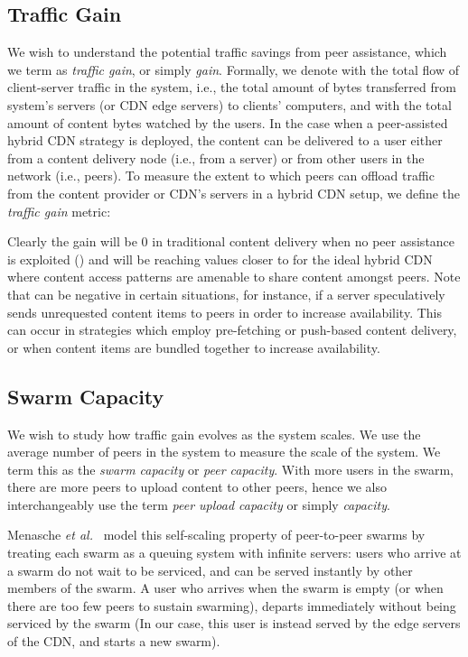 \documentclass[10pt, conference, letterpaper]{IEEEtran}
\begin{document}
\subsection{Traffic Gain}
We wish to understand the potential traffic savings from peer assistance, which we term as \emph{traffic gain}, or simply \emph{gain}. Formally, we denote with  the total flow of client-server traffic in the system, i.e., the total amount of bytes transferred from system's servers (or CDN edge servers) to clients' computers, and with  the total amount of content bytes watched by the users. In the case when a peer-assisted hybrid CDN strategy is deployed, the content can be delivered to a user either from a content delivery node (i.e., from a server) or from other users in the network (i.e., peers).  To measure the extent to which peers can offload traffic from the content provider or CDN's servers in a hybrid CDN setup, we define the \emph{traffic gain} metric: 


Clearly the gain will be 0 in traditional content delivery when no peer assistance is exploited () and will be reaching values closer to  for the ideal hybrid CDN where content access patterns are amenable to share content amongst peers. Note that  can be negative in certain situations, for instance, if a server speculatively sends unrequested content items to peers in order to increase availability. This can occur in strategies which employ pre-fetching or push-based content delivery, or when content items are bundled together to increase availability.

\subsection{Swarm Capacity}
We wish to study how traffic gain evolves as the system scales. We use the average number of peers in the system to measure the scale of the system. We term this as the \emph{swarm capacity} or \emph{peer capacity}. With more users in the swarm, there are more peers to upload content to other peers, hence we also interchangeably use  the term \emph{peer upload capacity} or simply \emph{capacity}. 

Menasche \textsl{et al.}~\cite{menasche2013content} model  this self-scaling property of peer-to-peer swarms by treating each swarm as a queuing system with infinite servers: users who arrive at a swarm do not wait to be serviced, and can be served instantly by other members of the swarm. A user who arrives when the swarm is empty (or when there are too few peers to sustain swarming), departs immediately without being serviced by the swarm (In our case, this user is instead served by the edge servers of the CDN, and starts a new swarm). 
\end{document}
